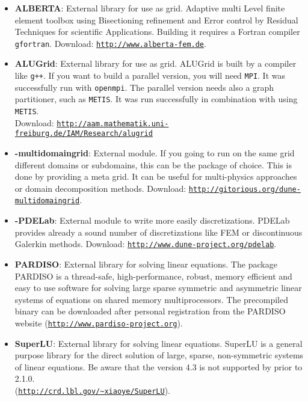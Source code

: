 \begin{itemize}
\item \textbf{ALBERTA}: External library for use as grid. Adaptive multi Level finite element toolbox using Bisectioning refinement and Error control by Residual Techniques for scientific Applications. Building it requires a Fortran compiler \texttt{gfortran}. Download: \texttt{\url{http://www.alberta-fem.de}}.

\item \textbf{ALUGrid}: External library for use as grid. ALUGrid is built by a \Cplusplus compiler like \texttt{g++}. If you want to build a parallel version, you will need \texttt{MPI}. It was successfully run with \texttt{openmpi}. The parallel version needs also a graph partitioner, such as \texttt{METIS}. It was run successfully in combination with \Dune using \texttt{METIS}. \\
Download: \texttt{\url{http://aam.mathematik.uni-freiburg.de/IAM/Research/alugrid}}

\item \textbf{\Dune-multidomaingrid}: External module. If you going to run on the same grid different domains or subdomains,
this can be the package of choice. This is done by providing a meta grid. It can be useful for multi-physics approaches or domain decomposition methods. Download: \texttt{\url{http://gitorious.org/dune-multidomaingrid}}. 

\item \textbf{\Dune-PDELab}: External module to write more easily discretizations. PDELab provides already a sound number of discretizations like FEM or discontinuous Galerkin methods. Download: \texttt{\url{http://www.dune-project.org/pdelab}}. 

\item \textbf{PARDISO}: External library for solving linear equations. The package PARDISO is a thread-safe, high-performance, robust, memory efficient and easy to use software for solving large sparse symmetric and asymmetric linear systems of equations on shared memory multiprocessors. The precompiled binary can be downloaded after personal registration from the PARDISO website (\texttt{\url{http://www.pardiso-project.org}}).

\item \textbf{SuperLU}: External library for solving linear equations. SuperLU is a general purpose library for the direct solution of large, sparse, non-symmetric systems of linear equations. Be aware that the version 4.3 is not supported by \Dune prior to 2.1.0. \\ (\texttt{\url{http://crd.lbl.gov/~xiaoye/SuperLU}}).


\end{itemize}
